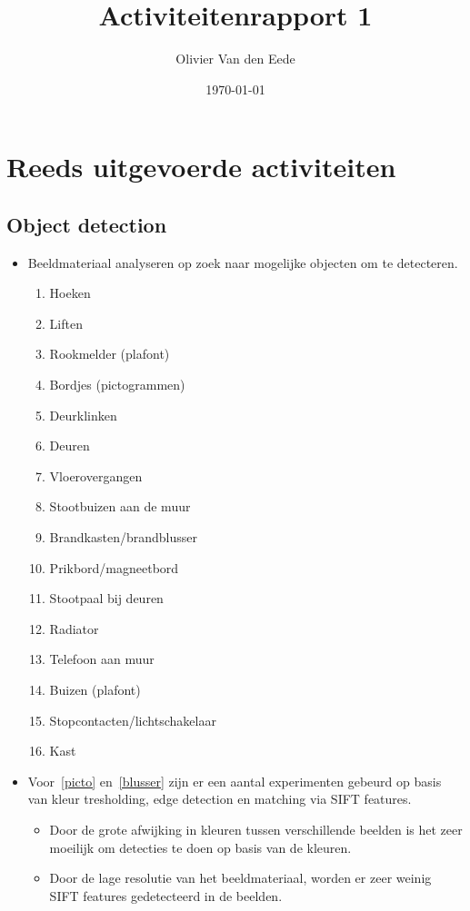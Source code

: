 \documentclass[11pt,a4paper]{article}
\title{Activiteitenrapport 1}
\author{Olivier Van den Eede}
\date{\today}
\begin{document}
    \maketitle
    
    \section{Reeds uitgevoerde activiteiten}
        \subsection{Object detection}
        \begin{itemize}
            \item Beeldmateriaal analyseren op zoek naar mogelijke objecten om te detecteren.
            \begin{enumerate}
                \item Hoeken
                \item Liften
                \item Rookmelder (plafont)
                \item Bordjes (pictogrammen) \label{picto}
                \item Deurklinken
                \item Deuren
                \item Vloerovergangen
                \item Stootbuizen aan de muur
                \item Brandkasten/brandblusser \label{blusser}
                \item Prikbord/magneetbord
                \item Stootpaal bij deuren
                \item Radiator
                \item Telefoon aan muur
                \item Buizen (plafont)
                \item Stopcontacten/lichtschakelaar
                \item Kast
            \end{enumerate}

            \item Voor~\ref{picto} en~\ref{blusser} zijn er een aantal experimenten gebeurd op basis van kleur tresholding, edge detection en matching via SIFT features.
            \begin{itemize}
                    \item Door de grote afwijking in kleuren tussen verschillende beelden is het zeer moeilijk om detecties te doen op basis van de kleuren.
                    \item Door de lage resolutie van het beeldmateriaal, worden er zeer weinig SIFT features gedetecteerd in de beelden.
            \end{itemize}


\end{itemize}
\end{document}
